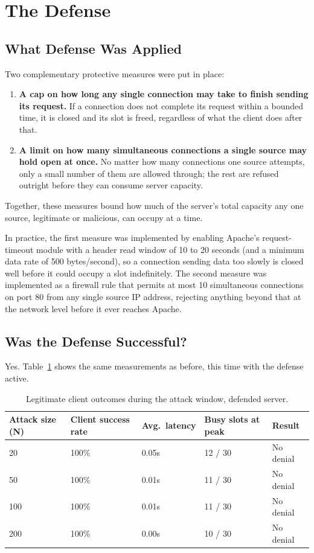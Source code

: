 \documentclass[11pt]{article}
\begin{document}
\section{The Defense}

\subsection{What Defense Was Applied}

Two complementary protective measures were put in place:

\begin{enumerate}
    \item \textbf{A cap on how long any single connection may take to
    finish sending its request.} If a connection does not complete its
    request within a bounded time, it is closed and its slot is freed,
    regardless of what the client does after that.
    \item \textbf{A limit on how many simultaneous connections a single
    source may hold open at once.} No matter how many connections one
    source attempts, only a small number of them are allowed through;
    the rest are refused outright before they can consume server
    capacity.
\end{enumerate}

Together, these measures bound how much of the server's total capacity
any one source, legitimate or malicious, can occupy at a time.

In practice, the first measure was implemented by enabling Apache's
request-timeout module with a header read window of 10 to 20 seconds
(and a minimum data rate of 500 bytes/second), so a connection sending
data too slowly is closed well before it could occupy a slot
indefinitely. The second measure was implemented as a firewall rule
that permits at most 10 simultaneous connections on port 80 from any
single source IP address, rejecting anything beyond that at the network
level before it ever reaches Apache.

\subsection{Was the Defense Successful?}

Yes. Table~\ref{tab:defense-results} shows the same measurements as
before, this time with the defense active.

\begin{table}[H]
\centering
\caption{Legitimate client outcomes during the attack window, defended server.}
\label{tab:defense-results}
\begin{tabular}{lllll}
\toprule
Attack size (N) & Client success rate & Avg.\ latency & Busy slots at peak & Result \\
\midrule
20  & 100\% & 0.05s & 12 / 30 & No denial \\
50  & 100\% & 0.01s & 11 / 30 & No denial \\
100 & 100\% & 0.01s & 11 / 30 & No denial \\
200 & 100\% & 0.00s & 10 / 30 & No denial \\
\bottomrule
\end{tabular}
\end{table}
\end{document}

